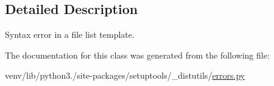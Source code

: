 \subsection{Detailed Description}
\begin{DoxyVerb}Syntax error in a file list template.\end{DoxyVerb}
 

The documentation for this class was generated from the following file\+:\begin{DoxyCompactItemize}
\item 
venv/lib/python3./site-\/packages/setuptools/\+\_\+distutils/\hyperlink{__distutils_2errors_8py}{errors.\+py}\end{DoxyCompactItemize}
